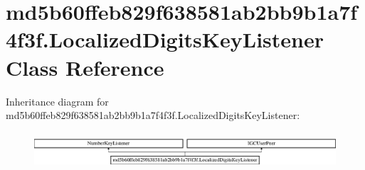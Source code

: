 \hypertarget{classmd5b60ffeb829f638581ab2bb9b1a7f4f3f_1_1LocalizedDigitsKeyListener}{}\section{md5b60ffeb829f638581ab2bb9b1a7f4f3f.\+Localized\+Digits\+Key\+Listener Class Reference}
\label{classmd5b60ffeb829f638581ab2bb9b1a7f4f3f_1_1LocalizedDigitsKeyListener}
Inheritance diagram for md5b60ffeb829f638581ab2bb9b1a7f4f3f.\+Localized\+Digits\+Key\+Listener\+:\begin{figure}[H]
\begin{center}
\leavevmode
\includegraphics[height=1.382716cm]{classmd5b60ffeb829f638581ab2bb9b1a7f4f3f_1_1LocalizedDigitsKeyListener}
\end{center}
\end{figure}
